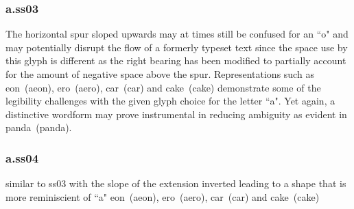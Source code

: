 \subsubsection{{\ssthree a}.ss03}
The horizontal spur sloped upwards may at times still be confused for an ``o"
and may potentially disrupt the flow of a formerly typeset text since
the space use by this glyph is different as the right bearing has been modified
to partially account for the amount of negative space above the spur.
Representations such as
\mbox{{eon} (aeon)},
\mbox{{ero} (aero)},
\mbox{{\ssdefault c{\ssthree a}r} (car)} and
\mbox{{\ssdefault c{\ssthree a}ke} (cake)}
demonstrate some of the legibility challenges with the given glyph choice for
the letter ``a". Yet again, a distinctive wordform may prove instrumental in
reducing ambiguity as evident in
\mbox{{\ssdefault p{\ssthree a}nda} (panda)}.

\subsubsection{{\ssfour a}.ss04}
similar to ss03 with the slope of the extension
inverted leading to a shape that is more reminiscient of ``a"
\mbox{{eon} (aeon)},
\mbox{{ero} (aero)},
\mbox{{\ssdefault c{\ssfour a}r} (car)} and
\mbox{{\ssdefault c{\ssthree a}ke} (cake)}
